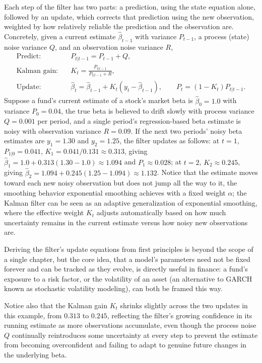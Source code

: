 \documentclass[../ai_in_finance]{subfiles}
\begin{document}
Each step of the filter has two parts: a prediction, using the state equation alone, followed by an update, which corrects that prediction using the new observation, weighted by how relatively reliable the prediction and the observation are. Concretely, given a current estimate $\hat\beta_{t-1}$ with variance $P_{t-1}$, a process (state) noise variance $Q$, and an observation noise variance $R$,
\begin{align*}
\text{Predict:} \quad & P_{t|t-1} = P_{t-1} + Q, \\
\text{Kalman gain:} \quad & K_t = \frac{P_{t|t-1}}{P_{t|t-1} + R}, \\
\text{Update:} \quad & \hat\beta_t = \hat\beta_{t-1} + K_t (y_t - \hat\beta_{t-1}), \qquad P_t = (1-K_t) P_{t|t-1}.
\end{align*}
Suppose a fund's current estimate of a stock's market beta is $\hat\beta_0 = 1.0$ with variance $P_0=0.04$, the true beta is believed to drift slowly with process variance $Q=0.001$ per period, and a single period's regression-based beta estimate is noisy with observation variance $R=0.09$. If the next two periods' noisy beta estimates are $y_1=1.30$ and $y_2=1.25$, the filter updates as follows: at $t=1$, $P_{1|0}=0.041$, $K_1 = 0.041/0.131 \approx 0.313$, giving $\hat\beta_1 = 1.0 + 0.313(1.30-1.0) \approx 1.094$ and $P_1 \approx 0.028$; at $t=2$, $K_2 \approx 0.245$, giving $\hat\beta_2 = 1.094 + 0.245(1.25 - 1.094) \approx 1.132$. Notice that the estimate moves toward each new noisy observation but does not jump all the way to it, the smoothing behavior exponential smoothing achieves with a fixed weight $\alpha$; the Kalman filter can be seen as an adaptive generalization of exponential smoothing, where the effective weight $K_t$ adjusts automatically based on how much uncertainty remains in the current estimate versus how noisy new observations are.

Deriving the filter's update equations from first principles is beyond the scope of a single chapter, but the core idea, that a model's parameters need not be fixed forever and can be tracked as they evolve, is directly useful in finance: a fund's exposure to a risk factor, or the volatility of an asset (an alternative to GARCH known as stochastic volatility modeling), can both be framed this way.

Notice also that the Kalman gain $K_t$ shrinks slightly across the two updates in this example, from $0.313$ to $0.245$, reflecting the filter's growing confidence in its running estimate as more observations accumulate, even though the process noise $Q$ continually reintroduces some uncertainty at every step to prevent the estimate from becoming overconfident and failing to adapt to genuine future changes in the underlying beta.
\end{document}
